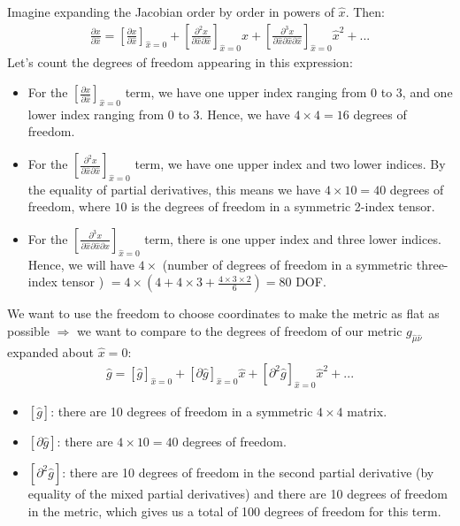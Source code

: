 \documentclass[11pt]{article}
\newcommand{\jac}[0]{\frac{\partial x}{\partial \hat{x}}}
\theoremstyle{definition}
\begin{document}
\newline
Imagine expanding the Jacobian order by order in powers of \( \hat{x} \). Then: 
\begin{align*}
	\jac = \left[ \jac \right]_{\hat{x} = 0 } + \left[ \frac{\partial^2 x}{\partial \hat{x} \partial \hat{x} } \right]_{\hat{x} = 0} \hat{x} + \left[ \frac{\partial^3 x}{\partial \hat{x} \partial \hat{x} \partial \hat{x} } \right]_{\hat{x} = 0} \hat{x}^2 + ... 
\end{align*}
Let's count the degrees of freedom appearing in this expression: 
\begin{itemize}[noitemsep]
	\item For the \( \left[ \jac \right]_{\hat{x} = 0 }  \) term, we have one upper index ranging from 0 to 3, and one lower index ranging from 0 to 3. Hence, we have \( 4 \times 4 = 16 \) degrees of freedom. 
	\item For the \( \left[ \frac{\partial^2 x}{\partial \hat{x} \partial \hat{x} } \right]_{\hat{x} = 0} \) term, we have one upper index and two lower indices. By the equality of partial derivatives, this means we have \( 4 \times 10 = 40 \) degrees of freedom, where \( 10 \) is the degrees of freedom in a symmetric 2-index tensor. 
	\item For the \( \left[ \frac{\partial^3 x}{\partial \hat{x} \partial \hat{x} \partial \hat{x} } \right]_{\hat{x} = 0} \) term, there is one upper index and three lower indices. Hence, we will have \( 4 \times \) (number of degrees of freedom in a symmetric three-index tensor ) \( = 4 \times ( 4 + 4 \times 3 + \frac{4 \times 3 \times 2}{6}) = 80 \) DOF. 
\end{itemize}
We want to use the freedom to choose coordinates to make the metric as flat as possible \( \Rightarrow \) we want to compare to the degrees of freedom of our metric \( g_{\hat{\mu} \hat{\nu}} \) expanded about \( \hat{x} = 0 \): 
\begin{align*}
	\hat{g} = [ \hat{g}]_{\hat{x} = 0 } + [ \partial \hat{g}]_{\hat{x} = 0 } \hat{x} + [ \partial^2 \hat{g} ]_{\hat{x} = 0 } \hat{x}^2 + ... 
\end{align*}
\begin{itemize}[noitemsep]
	\item \( [ \hat{g}] \): there are 10 degrees of freedom in a symmetric \( 4 \times 4 \) matrix. 
	\item \( [ \partial \hat{g}] \): there are \( 4 \times 10 = 40 \) degrees of freedom. 
	\item \( [ \partial^2 \hat{g} ] \): there are 10 degrees of freedom in the second partial derivative (by equality of the mixed partial derivatives) and there are 10 degrees of freedom in the metric, which gives us a total of 100 degrees of freedom for this term. 
\end{itemize}
\end{document}
